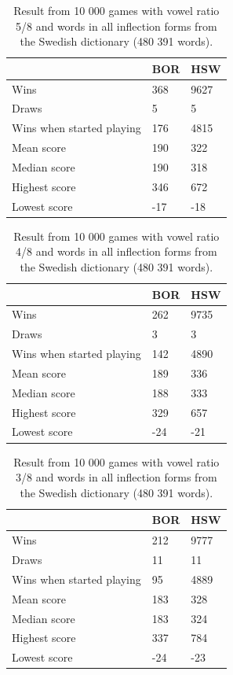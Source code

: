 \documentclass[a4paper, 12pt]{report}
\begin{document}
\begin{table}[h]
\centering
    \begin{tabular}{ l | l | l }
   	& BOR & HSW \\
   	\hline
   	Wins & 368 & 9627 \\
	Draws & 5 & 5 \\
	Wins when started playing & 176 & 4815 \\   	
	Mean score & 190 & 322 \\
	Median score & 190 & 318 \\	 	 
	Highest score & 346 & 672 \\
	Lowest score & -17 & -18\\		
    \end{tabular}
\caption{Result from 10 000 games with vowel ratio 5/8 and words in all inflection forms from the Swedish dictionary (480 391 words).}
\label{tab:borhswstats5}
\end{table}

\begin{table}[h]
\centering
    \begin{tabular}{ l | l | l }
   	& BOR & HSW \\
   	\hline
   	Wins & 262 & 9735 \\
	Draws & 3 & 3 \\
	Wins when started playing & 142 & 4890 \\   	
	Mean score & 189 & 336  \\
	Median score & 188 & 333 \\	 	 
	Highest score & 329 & 657 \\
	Lowest score & -24 & -21\\		
    \end{tabular}
\caption{Result from 10 000 games with vowel ratio 4/8 and words in all inflection forms from the Swedish dictionary (480 391 words).}
\label{tab:borhswstats4}
\end{table}

\begin{table}[h]
\centering
    \begin{tabular}{ l | l | l }
   	& BOR & HSW \\
   	\hline
   	Wins & 212 & 9777 \\
	Draws & 11 & 11 \\
	Wins when started playing & 95 & 4889 \\   	
	Mean score & 183 & 328  \\
	Median score & 183 & 324 \\	 	 
	Highest score & 337 & 784 \\
	Lowest score & -24 & -23\\		
    \end{tabular}
\caption{Result from 10 000 games with vowel ratio 3/8 and words in all inflection forms from the Swedish dictionary (480 391 words).}
\label{tab:borhswstats3}
\end{table}
\end{document}
